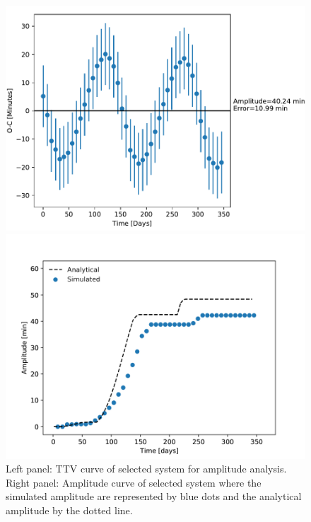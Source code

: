 \documentclass[12pt]{report}
\begin{document}
\begin{figure}
\centering
\begin{minipage}{.5\textwidth}
  \centering
  \includegraphics[width=1\linewidth]{img/62_1_new2.pdf}
 

\end{minipage}%
\begin{minipage}{.5\textwidth}
  \centering
  \includegraphics[width=1\linewidth]{img/62_1_new3_amp.pdf}
  

\end{minipage}
\caption{Left panel: TTV curve of selected system for amplitude analysis. Right panel: Amplitude curve of selected system where the simulated amplitude are represented by blue dots and the analytical amplitude by the dotted line.}
\label{fig:ampTime}
\end{figure}
\end{document}
